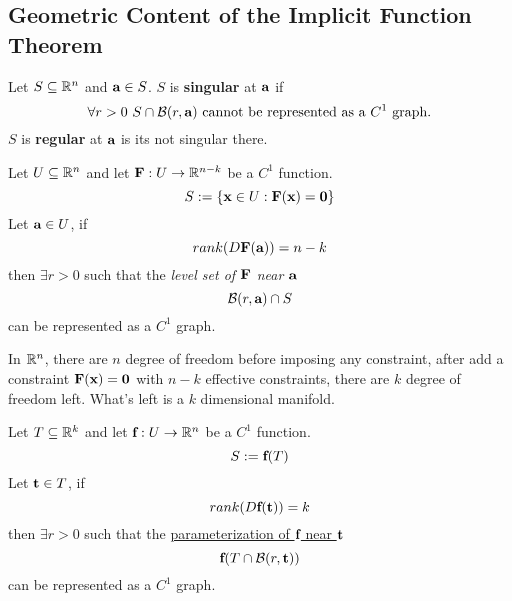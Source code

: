 \documentclass[11pt]{article}
\newcommand{\veF}[0]{\ve{F}}
\begin{document}
		\subsection{Geometric Content of the Implicit Function Theorem}
			\begin{definition}
				Let $S \subseteq \mathbb{R}^n$ and $\textbf{a} \in S$. $S$ is \textbf{singular} at $\textbf{a}$ if 
				\begin{equation}
					\forall r > 0\ S \cap \mathcal{{B}}(r, \textbf{a}) \text{{ cannot be represented as a $C^1$ graph.}}
				\end{equation}
				$S$ is \textbf{regular} at $\textbf{a}$ is its not singular there.
			\end{definition}
			
			\begin{theorem}
				Let $U \subseteq \mathbb{R}^n$ and let $\textbf{F}: U \to \mathbb{R}^{n-k}$ be a $C^1$ function.
				\begin{equation}
					S := \{\textbf{x} \in U: \textbf{F}(\textbf{x}) = \textbf{0}\}
				\end{equation}
				Let $\textbf{a} \in U$, if 
				\begin{equation}
					rank(D\textbf{F}(\textbf{a})) = n - k
				\end{equation}
				then $\exists r > 0$ such that the \emph{level set of $\textbf{F}$ near $\textbf{a}$}
				\begin{equation}
					\mathcal{{B}}(r, \textbf{a}) \cap S
				\end{equation}
				can be represented as a $C^1$ graph.
			\end{theorem}
			
			\begin{remark}[Interpretation]
				In $\mathbb{R}^n$, there are $n$ degree of freedom before imposing any constraint, after add a constraint $\veF(\vex) = \ve{0}$ with $n-k$ effective constraints, there are $k$ degree of freedom left. What's left is a $k$ dimensional manifold.
			\end{remark}
			
			\begin{theorem}
				Let $T \subseteq \mathbb{R}^k$ and let $\textbf{f}: U \to \mathbb{R}^n$ be a $C^1$ function.
				\begin{equation}
					S := \textbf{f}(T)
				\end{equation}
				Let $\textbf{t} \in T$, if
				\begin{equation}
					rank(D\textbf{f}(\textbf{t})) = k
				\end{equation}
				then $\exists r > 0$ such that the \ul{parameterization of $\textbf{f}$ near $\textbf{t}$}
				\begin{equation}
					\textbf{f}(T \cap \mathcal{{B}}(r, \textbf{t}))
				\end{equation}
				can be represented as a $C^1$ graph.
			\end{theorem}
\end{document}
